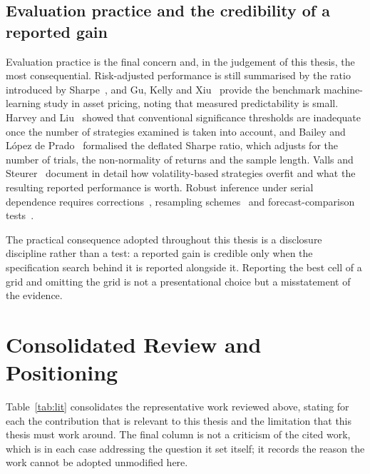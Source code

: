 \subsection{Evaluation practice and the credibility of a reported gain}

Evaluation practice is the final concern and, in the judgement of this thesis, the most
consequential. Risk-adjusted performance is still summarised by the ratio introduced by
Sharpe~\cite{sharpe1966}, and Gu, Kelly and Xiu~\cite{gu2020} provide the benchmark
machine-learning study in asset pricing, noting that measured predictability is small. Harvey
and Liu~\cite{harvey2015} showed that conventional significance thresholds are inadequate once
the number of strategies examined is taken into account, and Bailey and López de
Prado~\cite{bailey2014dsr} formalised the deflated Sharpe ratio, which adjusts for the number of
trials, the non-normality of returns and the sample length. Valls and Steurer~\cite{valls2026}
document in detail how volatility-based strategies overfit and what the resulting reported
performance is worth. Robust inference under serial dependence requires
corrections~\cite{newey1987}, resampling schemes~\cite{politis1994} and forecast-comparison
tests~\cite{diebold1995}.

The practical consequence adopted throughout this thesis is a disclosure discipline rather than
a test: a reported gain is credible only when the specification search behind it is reported
alongside it. Reporting the best cell of a grid and omitting the grid is not a presentational
choice but a misstatement of the evidence.

\section{Consolidated Review and Positioning}

Table~\ref{tab:lit} consolidates the representative work reviewed above, stating for each the
contribution that is relevant to this thesis and the limitation that this thesis must work
around. The final column is not a criticism of the cited work, which is in each case addressing
the question it set itself; it records the reason the work cannot be adopted unmodified here.

